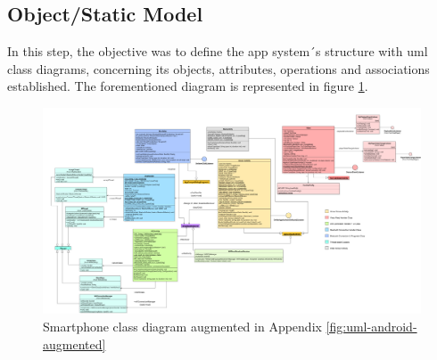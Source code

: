 \subsection{Object/Static Model}
In this step, the objective was to define the app system´s structure with \gls{uml} class diagrams, concerning its objects, attributes, operations and associations established.  The forementioned diagram is represented in figure \ref{fig:uml-android}.
%
\begin{figure}[!ht]
\centering
\includegraphics[width=\textwidth]{img/smartphone-static-diagram.png}
\caption{\label{fig:uml-android}Smartphone class diagram augmented in Appendix \ref{fig:uml-android-augmented}}
\end{figure}
%
